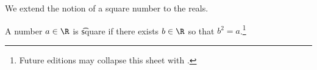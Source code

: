 

We extend the notion of a square number to the reals.


A number $a \in \R$ is \t{square} if there exists $b \in \R$ so that $b^2 = a$.\footnote{Future editions may collapse this sheet with .}

\blankpage

